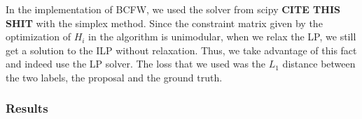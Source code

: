 In the implementation of BCFW, we used the solver from scipy \textbf{CITE THIS
SHIT} with the simplex method. Since the constraint matrix given by the
optimization of $H_i$ in the algorithm is unimodular, when we relax the LP, we
still get a solution to the ILP without relaxation. Thus, we take advantage of
this fact and indeed use the LP solver. The loss that we used was the $L_1$
distance between the two labels, the proposal and the ground truth.

\subsubsection{Results}

